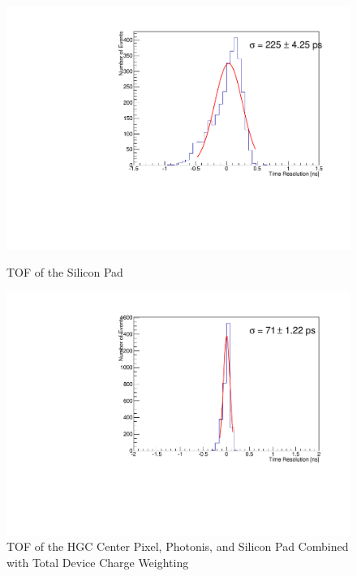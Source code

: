 \documentclass[12pt]{article}
\begin{document}
\begin{figure}[h]
\centering
\begin{minipage}[t]{.49\textwidth}
	\centering
	\includegraphics[width=\textwidth]{deltaTSiPad.pdf}
	\caption{TOF of the Silicon Pad}
	\label{fig:SiPad}
\end{minipage} \hfill
\begin{minipage}[t]{.49\textwidth}
	\centering
	\includegraphics[width=\textwidth]{deltaTWeightsCorrected_totalcharge.pdf}
	\caption{TOF of the HGC Center Pixel, Photonis, and Silicon Pad Combined with Total Device Charge Weighting}
	\label{fig:wctc}
\end{minipage}
\end{figure}
\end{document}
